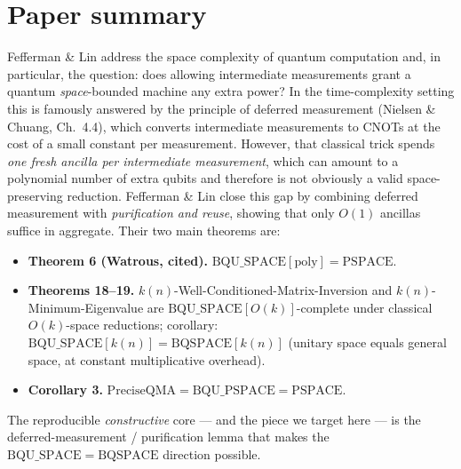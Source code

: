 \documentclass[11pt]{article}
\begin{document}
\section{Paper summary}\label{sec:summary}
Fefferman \& Lin address the space complexity of quantum computation and, in particular, the
question: does allowing intermediate measurements grant a quantum \emph{space}-bounded machine any
extra power?  In the time-complexity setting this is famously answered by the principle of
deferred measurement (Nielsen \& Chuang, Ch.~4.4), which converts intermediate measurements to
CNOTs at the cost of a small constant per measurement.  However, that classical trick spends
\emph{one fresh ancilla per intermediate measurement}, which can amount to a polynomial number of
extra qubits and therefore is not obviously a valid space-preserving reduction.  Fefferman \&
Lin close this gap by combining deferred measurement with \emph{purification and reuse}, showing
that only $O(1)$ ancillas suffice in aggregate.  Their two main theorems are:
\begin{itemize}
  \item \textbf{Theorem 6 (Watrous, cited).}  $\mathrm{BQU\_SPACE}[\mathrm{poly}] = \mathrm{PSPACE}$.
  \item \textbf{Theorems 18--19.}  $k(n)$-Well-Conditioned-Matrix-Inversion and $k(n)$-Minimum-Eigenvalue
        are $\mathrm{BQU\_SPACE}[O(k)]$-complete under classical $O(k)$-space reductions; corollary:
        $\mathrm{BQU\_SPACE}[k(n)] = \mathrm{BQSPACE}[k(n)]$ (unitary space equals general space, at
        constant multiplicative overhead).
  \item \textbf{Corollary 3.}  $\mathrm{PreciseQMA} = \mathrm{BQU\_PSPACE} = \mathrm{PSPACE}$.
\end{itemize}
The reproducible \emph{constructive} core --- and the piece we target here --- is the
deferred-measurement / purification lemma that makes the $\mathrm{BQU\_SPACE} = \mathrm{BQSPACE}$ direction
possible.
\end{document}
